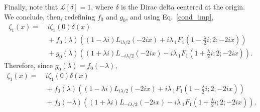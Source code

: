 \documentclass[%
 aip,
 jmp,%
 amsmath,amssymb,
 reprint,%
]{revtex4-2}
\begin{document}
Finally, note that $\mathcal L[\delta] =1$, where $\delta$ is the Dirac delta centered at the origin. We conclude, then, redefining $f_0$ and $g_0$, and using Eq.~\eqref{cond_imp},
\[
\begin{aligned}
\zeta_1(x)= &~{}i \zeta_1(0)\delta(x) \\%
&~{} + f_0(\lambda) \left(  (1-\lambda i)  L_{i \lambda/2}(-2 i x)  + i\lambda \, _1F_1\left(1- \frac{\lambda}2 i ;2;-2 i x \right) \right)\\
&~{} + g_0(\lambda) \left( (1+ \lambda i)L_{-i \lambda/2}(-2 i x) - i\lambda \, _1F_1\left(1+  \frac{\lambda}2i ;2;-2 i x \right)\right).
\end{aligned}
\]
Therefore, since $g_0(\lambda)=f_0(-\lambda)$,
\begin{equation}\label{eq:sol-zeta1(x)}
\begin{aligned}
\zeta_1(x)= &~{}i \zeta_1(0)\delta(x) \\%
&~{} + f_0(\lambda) \left(  (1-\lambda i)  L_{i \lambda/2}(-2 i x)  + i\lambda \, _1F_1\left(1- \frac{\lambda}2 i ;2;-2 i x \right) \right)\\
&~{} + f_0(-\lambda) \left( (1+ \lambda i)L_{-i \lambda/2}(-2 i x) - i\lambda \, _1F_1\left(1+  \frac{\lambda}2i ;2;-2 i x \right)\right).
\end{aligned}
\end{equation}
\end{document}
